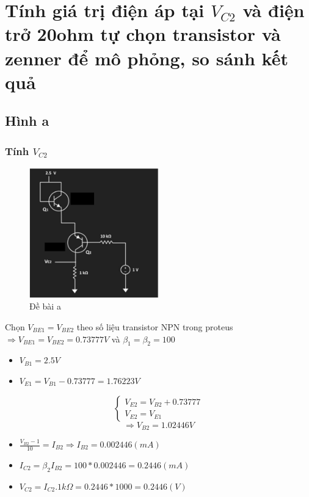 \cleardoublepage
\section{Tính giá trị điện áp tại $V_{C2}$ và điện trở 20ohm tự chọn transistor và zenner để mô phỏng, so sánh kết quả}
    \subsection{Hình a}
    \subsubsection{Tính $V_{C2}$}
    \begin{figure}[H]
        \centering
        \includegraphics[width=0.5\textwidth]{pictures/topic5_a.png}
        \caption{Đề bài a}					
    \end{figure}
    Chọn $V_{BE1} = V_{BE2}$ theo số liệu transistor NPN trong proteus \\
    $\Rightarrow V_{BE1} = V_{BE2} = 0.73777V$ và $\beta _1 = \beta _2 = 100$\\
    \begin{itemize}
        \item $V_{B1} = 2.5V$
        \item $V_{E1} = V_{B1} - 0.73777 = 1.76223V$
    \end{itemize}
    \[
    \begin{cases}
        V_{E2} = V_{B2} + 0.73777 \\
        V_{E2} = V_{E1}
    \end{cases}
    \]
    \[
        \Rightarrow V_{B2} = 1.02446V
    \]
    \begin{itemize}
        \item $\frac{V_{B2}-1}{10} = I_{B2} \Rightarrow I_{B2} = 0.002446(mA)$  
        \item $I_{C2} = \beta _2 I_{B2} = 100*0.002446 = 0.2446 (mA)$ 
        \item $V_{C2} = I_{C2}.1k\Omega  = 0.2446*1000 = 0.2446 (V)$
    \end{itemize}
